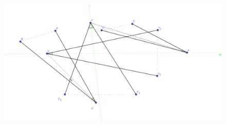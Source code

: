 \documentclass[11pt,helvetica,letter]{article}
\begin{document}
\begin{figure}[h]
  \centering
  \includegraphics[width=12cm]{doble_contencion}
\end{figure}
\end{document}
